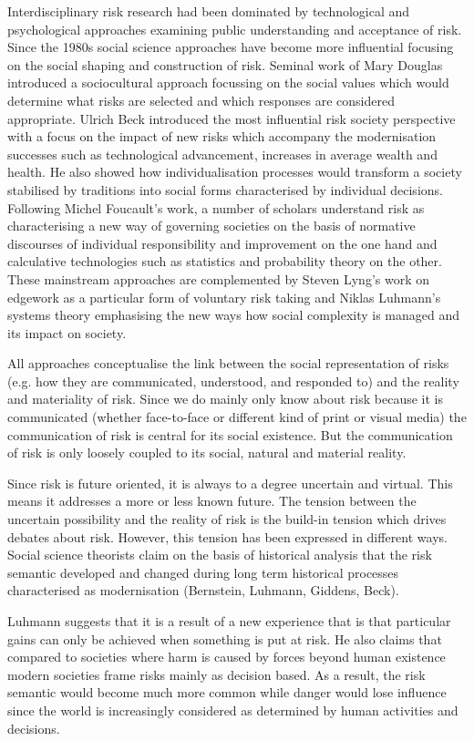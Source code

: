 Interdisciplinary risk research had been dominated by technological and psychological approaches examining public understanding and acceptance of risk. Since the 1980s social science approaches have become more influential focusing on the social shaping and construction of risk. Seminal work of Mary Douglas introduced a sociocultural approach focussing on the social values which would determine what risks are selected and which responses are considered appropriate. Ulrich Beck introduced the most influential risk society perspective with a focus on the impact of new risks which accompany the modernisation successes such as technological advancement, increases in average wealth and health. He also showed how individualisation processes would transform a society stabilised by traditions into social forms characterised by individual decisions. Following Michel Foucault's work, a number of scholars understand risk as characterising a new way of governing societies on the basis of normative discourses of individual responsibility and improvement on the one hand and calculative technologies such as statistics and probability theory on the other. These mainstream approaches are complemented by Steven Lyng's work on edgework as a particular form of voluntary risk taking and Niklas Luhmann's systems theory emphasising the new ways how social complexity is managed and its impact on society.

All approaches conceptualise the link between the social representation of risks (e.g. how they are communicated, understood, and responded to) and the reality and materiality of risk. Since we do mainly only know about risk because it is communicated (whether face-to-face or different kind of print or visual media) the communication of risk is central for its social existence. But the communication of risk is only loosely coupled to its social, natural and material reality.

Since risk is future oriented, it is always to a degree uncertain and virtual. This means it addresses a more or less known future. The tension between the uncertain possibility and the reality of risk is the build-in tension which drives debates about risk. However, this tension has been expressed in different ways. Social science theorists claim on the basis of historical analysis that the risk semantic developed and changed during long term historical processes characterised as modernisation (Bernstein, Luhmann, Giddens, Beck).

Luhmann suggests that it is a result of a new experience that is that particular gains can only be achieved when something is put at risk. He also claims that compared to societies where harm is caused by forces beyond human existence modern societies frame risks mainly as decision based. As a result, the risk semantic would become much more common while danger would lose influence since the world is increasingly considered as determined by human activities and decisions. 

